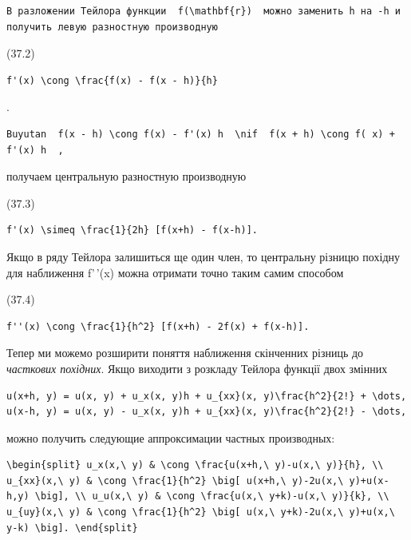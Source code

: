\documentclass[
  ukrainian,
]{article}
\begin{document}
\begin{verbatim}
В разложении Тейлора функции  f(\mathbf{r})  можно заменить h на -h и получить левую разностную производную
\end{verbatim}

(37.2)

\begin{verbatim}
f'(x) \cong \frac{f(x) - f(x - h)}{h}
\end{verbatim}

.

\begin{verbatim}
Buyutan  f(x - h) \cong f(x) - f'(x) h  \nif  f(x + h) \cong f( x) + f'(x) h  ,
\end{verbatim}

получаем центральную разностную производную

(37.3)

\begin{verbatim}
f'(x) \simeq \frac{1}{2h} [f(x+h) - f(x-h)].
\end{verbatim}

Якщо в ряду Тейлора залишиться ще один член, то центральну різницю
похідну для наближення f'\,'(x) можна отримати точно таким самим
способом

(37.4)

\begin{verbatim}
f''(x) \cong \frac{1}{h^2} [f(x+h) - 2f(x) + f(x-h)].
\end{verbatim}

Тепер ми можемо розширити поняття наближення скінченних різниць до
\emph{часткових похідних}. Якщо виходити з розкладу Тейлора функції двох
змінних

\begin{verbatim}
u(x+h, y) = u(x, y) + u_x(x, y)h + u_{xx}(x, y)\frac{h^2}{2!} + \dots,
u(x-h, y) = u(x, y) - u_x(x, y)h + u_{xx}(x, y)\frac{h^2}{2!} - \dots,
\end{verbatim}

можно получить следующие аппроксимации частных производных:

\begin{verbatim}
\begin{split} u_x(x,\ y) & \cong \frac{u(x+h,\ y)-u(x,\ y)}{h}, \\ u_{xx}(x,\ y) & \cong \frac{1}{h^2} \big[ u(x+h,\ y)-2u(x,\ y)+u(x-h,y) \big], \\ u_u(x,\ y) & \cong \frac{u(x,\ y+k)-u(x,\ y)}{k}, \\ u_{uy}(x,\ y) & \cong \frac{1}{h^2} \big[ u(x,\ y+k)-2u(x,\ y)+u(x,\ y-k) \big]. \end{split}
\end{verbatim}
\end{document}
